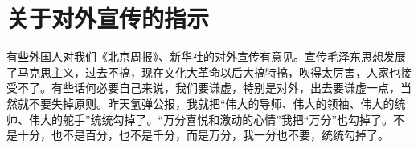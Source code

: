 \section[关于对外宣传的指示（一九六七年六月十八日）]{关于对外宣传的指示}


有些外国人对我们《北京周报》、新华社的对外宣传有意见。宣传毛泽东思想发展了马克思主义，过去不搞，现在文化大革命以后大搞特搞，吹得太厉害，人家也接受不了。有些话何必要自己来说，我们要谦虚，特别是对外，出去要谦虚一点，当然就不要失掉原则。昨天氢弹公报，我就把“伟大的导师、伟大的领袖、伟大的统帅、伟大的舵手”统统勾掉了。“万分喜悦和激动的心情”我把“万分”也勾掉了。不是十分，也不是百分，也不是千分，而是万分，我一分也不要，统统勾掉了。

